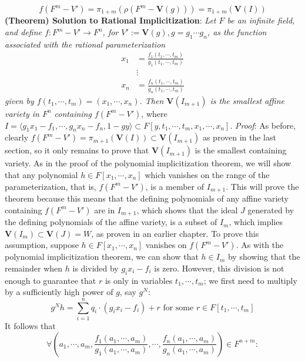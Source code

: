 \documentclass{article}
\begin{document}
$$ f(F^m - V') = \pi_{1 + m}(\rho(F^m - \mathbf{V}(g))) = \pi_{1 + m}(\mathbf{V}(I)) $$
\newline \newline
\textbf{(Theorem) Solution to Rational Implicitization}: \textit{Let $ F $ be an infinite field, and define $ f: F^m - V' \rightarrow F^n $, for $ V' := \mathbf{V}(g), g = g_1 \cdots g_n $, as the function associated with the rational parameterization}
$$ \begin{aligned}
	x_1 &= \frac{f_1(t_1, \cdots, t_m)}{g_1(t_1, \cdots, t_m)} \\
	& \vdots \\
	x_n &= \frac{f_n(t_1, \cdots, t_m)}{g_n(t_1, \cdots, t_m)}
\end{aligned} $$
\indent \textit{given by $ f(t_1, \cdots, t_m) = (x_1, \cdots, x_n) $. Then $ \mathbf{V}(I_{m + 1}) $ is the smallest affine variety in $ F^n $ containing $ f(F^m - V') $}, where $ I = \langle g_1 x_1 - f_1, \cdots, g_n x_n - f_n, 1 - g y \rangle \subset F[y, t_1, \cdots, t_m, x_1, \cdots, x_n] $.
\newline
\indent \textit{Proof}: As before, clearly $ f(F^m - V') = \pi_{m + 1}(\mathbf{V}(I)) \subset \mathbf{V}(I_{m + 1}) $ as proven in the last section, so it only remains to prove that $ \mathbf{V}(I_{m + 1}) $ is the smallest containing variety. As in the proof of the polynomial implicitization theorem, we will show that any polynomial $ h \in F[x_1, \cdots, x_n] $ which vanishes on the range of the parameterization, that is, $ f(F^m - V') $, is a member of $ I_{m + 1} $. This will prove the theorem because this means that the defining polynomials of any affine variety containing $ f(F^m - V') $ are in $ I_{m + 1} $, which shows that the ideal $ J $ generated by the defining polynomials of the affine variety, is a subset of $ I_m $, which implies $ \mathbf{V}(I_m) \subset \mathbf{V}(J) = W $, as proven in an earlier chapter.
\newline
\indent To prove this assumption, suppose $ h \in F[x_1, \cdots, x_n] $ vanishes on $ f(F^m - V') $. As with the polynomial implicitization theorem, we can show that $ h \in I_m $ by showing that the remainder when $ h $ is divided by $ g_i x_i - f_i $ is zero. However, this division is not enough to guarantee that $ r $ is only in variables $ t_1, \cdots, t_m $; we first need to multiply by a sufficiently high power of $ g $, say $ g^N $:
$$ g^N h = \sum_{i = 1}^n q_i \cdot (g_i x_i - f_i)  + r \text{ for some } r \in F[t_1, \cdots, t_m] $$
It follows that 
$$ \forall \left( a_1, \cdots, a_m, \frac{f_1(a_1, \cdots, a_m)}{g_1(a_1, \cdots, a_m)}, \cdots, \frac{f_n(a_1, \cdots, a_m)}{g_n(a_1, \cdots, a_m)} \right) \in F^{n + m}: $$ 
\end{document}

